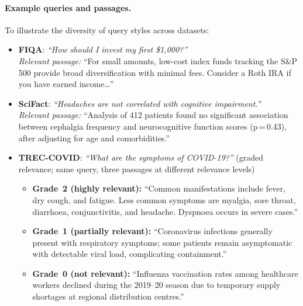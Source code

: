 \documentclass[12pt, a4paper]{article}
\newcommand{\tc}{TREC-COVID}
\newcommand{\fiqa}{FIQA}
\newcommand{\scifact}{SciFact}
\begin{document}
\paragraph{Example queries and passages.}
To illustrate the diversity of query styles across datasets:

\begin{itemize}
  \item \textbf{\fiqa{}}: \textit{``How should I invest my first \$1{,}000?''} \\
        \textit{Relevant passage:} ``For small amounts, low-cost index funds
        tracking the S\&P 500 provide broad diversification with minimal fees.
        Consider a Roth IRA if you have earned income\ldots''

  \item \textbf{\scifact{}}: \textit{``Headaches are not correlated with
        cognitive impairment.''} \\
        \textit{Relevant passage:} ``Analysis of 412 patients found no
        significant association between cephalgia frequency and neurocognitive
        function scores (p\,=\,0.43), after adjusting for age and comorbidities.''

  \item \textbf{\tc{}}: \textit{``What are the symptoms of COVID-19?''}
        (graded relevance; same query, three passages at different relevance levels)
        \begin{itemize}
          \item \textbf{Grade~2 (highly relevant):}
                ``Common manifestations include fever, dry cough, and fatigue.
                Less common symptoms are myalgia, sore throat, diarrhoea,
                conjunctivitis, and headache.  Dyspnoea occurs in severe cases.''
          \item \textbf{Grade~1 (partially relevant):}
                ``Coronavirus infections generally present with respiratory
                symptoms; some patients remain asymptomatic with detectable
                viral load, complicating containment.''
          \item \textbf{Grade~0 (not relevant):}
                ``Influenza vaccination rates among healthcare workers declined
                during the 2019--20 season due to temporary supply shortages
                at regional distribution centres.''
        \end{itemize}
\end{itemize}
\end{document}
